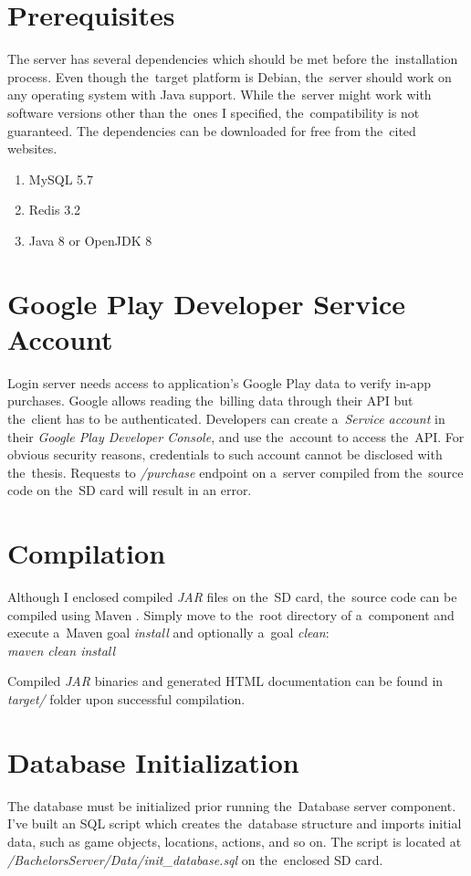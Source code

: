 \section{Prerequisites}
The server has several dependencies which should be met before the~installation process. Even though the~target platform is Debian, the~server should work on any operating system with Java support. While the~server might work with software versions other than the~ones I specified, the~compatibility is not guaranteed. The dependencies can be downloaded for free from the~cited websites.

\begin{enumerate}
	\item MySQL 5.7 \cite{mysql}
	\item Redis 3.2 \cite{redis}
	\item Java 8 or OpenJDK 8	
\end{enumerate}

\section{Google Play Developer Service Account}
Login server needs access to application's Google Play data to verify in-app purchases. Google allows reading the~billing data through their API but the~client has to be authenticated. Developers can create a~\textit{Service account} in their \textit{Google Play Developer Console}, and use the~account to access the~API. For obvious security reasons, credentials to such account cannot be disclosed with the~thesis. Requests to \textit{/purchase} endpoint on a~server compiled from the~source code on the~SD card will result in an error.

\section{Compilation}
Although I enclosed compiled \textit{JAR} files on the~SD card, the~source code can be compiled using Maven \cite{maven}. Simply move to the~root directory of a~component and execute a~Maven goal \textit{install} and optionally a~goal \textit{clean}:\\
\emph{maven clean install}

Compiled \textit{JAR} binaries and generated HTML documentation can be found in \textit{target/} folder upon successful compilation.

\section{Database Initialization}
The database must be initialized prior running the~Database server component. I've built an SQL script which creates the~database structure and imports initial data, such as game objects, locations, actions, and so on. The script is located at \textit{/BachelorsServer/Data/init\_database.sql} on the~enclosed SD card.

